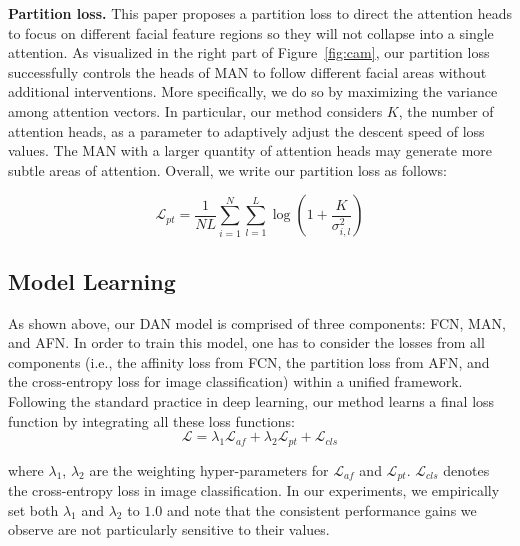\documentclass{article}
\begin{document}
\noindent\textbf{{Partition loss.}} This paper proposes a partition loss to direct the attention heads to focus on different facial feature regions so they will not collapse into a single attention. As visualized in the right part of Figure~\ref{fig:cam}, our partition loss successfully controls the heads of MAN to follow different facial areas without additional interventions. 
More specifically, we do so by maximizing the variance among attention vectors. In particular, our method considers $K$, the number of attention heads, as a parameter to adaptively adjust the descent speed of loss values. The MAN with a larger quantity of attention heads may generate more subtle areas of attention. Overall, we write our partition loss as follows:


\begin{equation}
    \mathcal{L}_{pt} = \frac{1}{NL} \sum_{i=1}^N\sum_{l=1}^L\log(1 + \frac{K}{\sigma_{i,l}^2})
\end{equation}

\subsection{Model Learning}
As shown above, our DAN model is comprised of three components: FCN, MAN, and AFN. In order to train this model, one has to consider the losses from all components (i.e., the affinity loss from FCN, the partition loss from AFN, and the cross-entropy loss for image classification) within a unified framework. Following the standard practice in deep learning, our method learns a final loss function by integrating all these loss functions:
\begin{equation}
    \mathcal{L} = \lambda_1\mathcal{L}_{af} + \lambda_2\mathcal{L}_{pt}  + \mathcal{L}_{cls}
\end{equation}

\noindent where $\lambda_1$, $\lambda_2$ are the weighting hyper-parameters for $\mathcal{L}_{af}$ and $\mathcal{L}_{pt}$. $\mathcal{L}_{cls}$ denotes the cross-entropy loss in image classification. {In our experiments, we empirically set both $\lambda_1$ and $\lambda_2$ to $1.0$ and note that the consistent performance gains we observe are not particularly sensitive to their values.}
\end{document}
